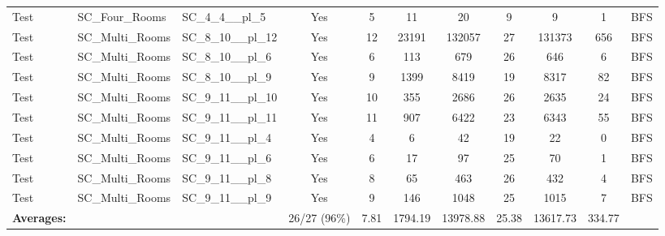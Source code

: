 \documentclass{article}
\begin{document}
\begin{tabular}{lllcccccccc}
Test & SC\_Four\_Rooms & SC\_4\_4\_\_pl\_5 & Yes & 5 & 11 & 20 & 9 & 9 & 1 & BFS \\
Test & SC\_Multi\_Rooms & SC\_8\_10\_\_pl\_12 & Yes & 12 & 23191 & 132057 & 27 & 131373 & 656 & BFS \\
Test & SC\_Multi\_Rooms & SC\_8\_10\_\_pl\_6 & Yes & 6 & 113 & 679 & 26 & 646 & 6 & BFS \\
Test & SC\_Multi\_Rooms & SC\_8\_10\_\_pl\_9 & Yes & 9 & 1399 & 8419 & 19 & 8317 & 82 & BFS \\
Test & SC\_Multi\_Rooms & SC\_9\_11\_\_pl\_10 & Yes & 10 & 355 & 2686 & 26 & 2635 & 24 & BFS \\
Test & SC\_Multi\_Rooms & SC\_9\_11\_\_pl\_11 & Yes & 11 & 907 & 6422 & 23 & 6343 & 55 & BFS \\
Test & SC\_Multi\_Rooms & SC\_9\_11\_\_pl\_4 & Yes & 4 & 6 & 42 & 19 & 22 & 0 & BFS \\
Test & SC\_Multi\_Rooms & SC\_9\_11\_\_pl\_6 & Yes & 6 & 17 & 97 & 25 & 70 & 1 & BFS \\
Test & SC\_Multi\_Rooms & SC\_9\_11\_\_pl\_8 & Yes & 8 & 65 & 463 & 26 & 432 & 4 & BFS \\
Test & SC\_Multi\_Rooms & SC\_9\_11\_\_pl\_9 & Yes & 9 & 146 & 1048 & 25 & 1015 & 7 & BFS \\
\textbf{Averages:} & & & 26/27 (96\%) & 7.81 & 1794.19 & 13978.88 & 25.38 & 13617.73 & 334.77 & \\
\bottomrule
\end{tabular}
\newpage
\end{document}
